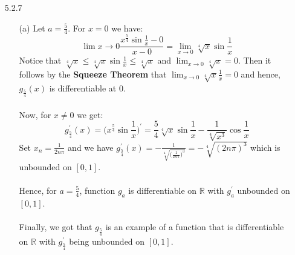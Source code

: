 \documentclass[11pt]{article}
\newcommand{\reals}{\mathbb{R}}
\begin{document}
\begin{itemize}
    \item[5.2.7]
        \begin{itemize}
            \item[(a)]
                Let $a = \frac{5}{4}$. For $x = 0$ we have:
                \begin{equation*}
                    \lim{x \to 0}\frac{x^\frac{5}{4}\sin{\frac{1}{x}} - 0}{x - 0}
                        = \lim_{x \to 0}\sqrt[4]{x}\sin{\frac{1}{x}}
                \end{equation*}
                Notice that $\sqrt[4]{x} \leq \sqrt[4]{x}\sin{\frac{1}{x}} \leq
                \sqrt[4]{x}$ and $\lim_{x \to 0}\sqrt[4]{x} = 0$. Then it
                follows by the \textbf{Squeeze Theorem} that $\lim_{x \to
                0}\sqrt[4]{x}\frac{1}{x} = 0$ and hence, $g_{\frac{5}{4}}(x)$
                is differentiable at $0$.
                \\
                \\
                Now, for $x \neq 0$ we get:
                \begin{equation*}
                    g_{\frac{5}{4}}^\prime(x) = \Big(x^\frac{5}{4}\sin{\frac{1}{x}}\Big)^\prime
                                              = \frac{5}{4}\sqrt[4]{x}\sin{\frac{1}{x}} - \frac{1}{\sqrt[4]{x^3}}\cos{\frac{1}{x}}
                \end{equation*}
                Set $x_n = \frac{1}{2n\pi}$ and we have
                $g_{\frac{5}{4}}^\prime(x) =
                -\frac{1}{\sqrt[4]{\Big(\frac{1}{2n\pi}\Big)^3}} =
                -\sqrt[4]{(2n\pi)^3}$ which is unbounded on $[0, 1]$.
                \\
                \\
                Hence, for $a = \frac{5}{4}$, function $g_a$ is differentiable
                on $\reals$ with $g_a^\prime$ unbounded on $[0, 1]$.
                \\
                \\
                Finally, we got that $g_{\frac{5}{4}}$ is an example of a
                function that is differentiable on $\reals$ with
                $g_{\frac{5}{4}}^\prime$ being unbounded on $[0, 1]$.


\end{itemize}
\end{itemize}
\end{document}
